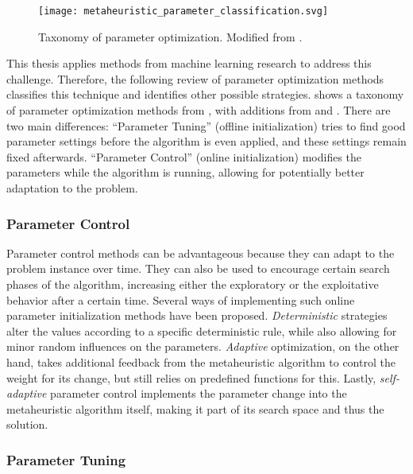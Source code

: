 \begin{figure}[h]
	\centering
	\texttt{[image: metaheuristic\_parameter\_classification.svg]}
	\caption[Taxonomy of parameter optimization]{Taxonomy of parameter optimization. Modified from \citet{eiben1999parameter}.}
	\label{fig:paramtax}
\end{figure}

This thesis applies methods from machine learning research to address this challenge. Therefore, the following review of parameter optimization methods classifies this technique and identifies other possible strategies.  shows a taxonomy of parameter optimization methods from \citet{eiben1999parameter}, with additions from \citet{talbi2009metaheuristics} and \citet{stutzle2012parameter}. There are two main differences: \enquote{Parameter Tuning} (offline initialization) tries to find good parameter settings before the algorithm is even applied, and these settings remain fixed afterwards. \enquote{Parameter Control} (online initialization) modifies the parameters while the algorithm is running, allowing for potentially better adaptation to the problem.

\subsubsection{Parameter Control}

Parameter control methods can be advantageous because they can adapt to the problem instance over time. They can also be used to encourage certain search phases of the algorithm, increasing either the exploratory or the exploitative behavior after a certain time. Several ways of implementing such online parameter initialization methods have been proposed. \textit{Deterministic} strategies alter the values according to a specific deterministic rule, while also allowing for minor random influences on the parameters. \textit{Adaptive} optimization, on the other hand, takes additional feedback from the metaheuristic algorithm to control the weight for its change, but still relies on predefined functions for this. Lastly, \textit{self-adaptive} parameter control implements the parameter change into the metaheuristic algorithm itself, making it part of its search space and thus the solution.

\subsubsection{Parameter Tuning}
\label{chap:tuning}


